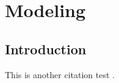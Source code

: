 \newpage
\chapter{Modeling}
\section{Introduction}
\lipsum[1-4]
This is another citation test \citep{placeholder}.